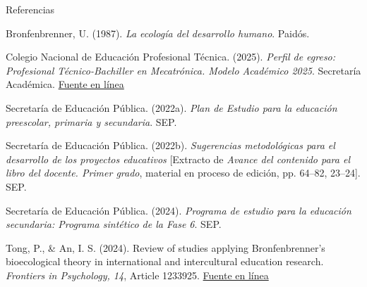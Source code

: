 \documentclass[
	spanish,
	aspectratio=1610,
	xcolor={dvipsnames,table}
]{beamer}
\begin{document}
\begin{frame}{Referencias}
\fontsize{9}{11}\selectfont\raggedright 
{\setlength{\parskip}{6pt}
\par\hangindent=1.27cm  Bronfenbrenner, U. (1987). \textit{La ecología del desarrollo humano}. Paidós.
\par\hangindent=1.27cm Colegio Nacional de Educación Profesional Técnica. (2025). \textit{Perfil de egreso: Profesional Técnico-Bachiller en Mecatrónica. Modelo Académico 2025}. Secretaría Académica. \href{https://www.conalep.edu.mx/sites/default/files/micrositios/perfil_egreso_2025/ElectyElectro/PE25_Mecatr\%C3\%B3nica.pdf}{Fuente en línea}
\par\hangindent=1.27cm  Secretaría de Educación Pública. (2022a). \textit{Plan de Estudio para la educación preescolar, primaria y secundaria}. SEP.
\par\hangindent=1.27cm  Secretaría de Educación Pública. (2022b). \textit{Sugerencias metodológicas para el desarrollo de los proyectos educativos} [Extracto de \textit{Avance del contenido para el libro del docente. Primer grado}, material en proceso de edición, pp. 64--82, 23--24]. SEP.
\par\hangindent=1.27cm  Secretaría de Educación Pública. (2024). \textit{Programa de estudio para la educación secundaria: Programa sintético de la Fase 6}. SEP.
\par\hangindent=1.27cm  Tong, P., \& An, I. S. (2024). Review of studies applying Bronfenbrenner’s bioecological theory in international and intercultural education research. \textit{Frontiers in Psychology, 14}, Article 1233925. \href{https://doi.org/10.3389/fpsyg.2023.1233925}{Fuente en línea}
}


\end{frame}
\end{document}
